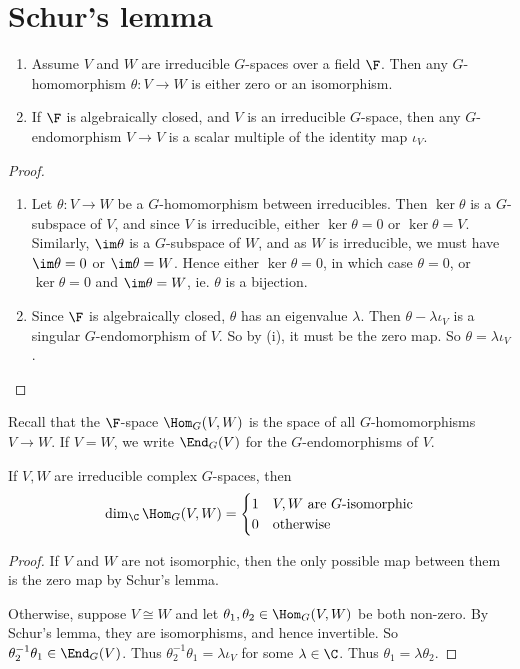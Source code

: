 \documentclass[a4paper]{article}
\begin{document}
\section{Schur's lemma}
\begin{thm}\leavevmode
  \begin{enumerate}
    \item Assume $V$ and $W$ are irreducible $G$-spaces over a field $\F$. Then any $G$-homomorphism $\theta: V \to W$ is either zero or an isomorphism.
    \item If $\F$ is algebraically closed, and $V$ is an irreducible $G$-space, then any $G$-endomorphism $V \to V$ is a scalar multiple of the identity map $\iota_V$.
  \end{enumerate}
\end{thm}

\begin{proof}\leavevmode
  \begin{enumerate}
    \item Let $\theta: V \to W$ be a $G$-homomorphism between irreducibles. Then $\ker \theta$ is a $G$-subspace of $V$, and since $V$ is irreducible, either $\ker \theta = 0$ or $\ker \theta = V$. Similarly, $\im \theta$ is a $G$-subspace of $W$, and as $W$ is irreducible, we must have $\im \theta = 0$ or $\im \theta = W$. Hence either $\ker \theta = 0$, in which case $\theta = 0$, or $\ker \theta = 0$ and $\im \theta = W$, ie. $\theta$ is a bijection.
    \item Since $\F$ is algebraically closed, $\theta$ has an eigenvalue $\lambda$. Then $\theta - \lambda \iota_V$ is a singular $G$-endomorphism of $V$. So by (i), it must be the zero map. So $\theta = \lambda \iota_V$.
  \end{enumerate}
\end{proof}

Recall that the $\F$-space $\Hom_G(V, W)$ is the space of all $G$-homomorphisms $V \to W$. If $V = W$, we write $\End_G(V)$ for the $G$-endomorphisms of $V$.

\begin{cor}
  If $V, W$ are irreducible complex $G$-spaces, then
  \[
    \dim_\C \Hom_G(V, W) =
    \begin{cases}
      1 & V, W\text{ are $G$-isomorphic}\\
      0 & \text{otherwise}
    \end{cases}
  \]
\end{cor}

\begin{proof}
  If $V$ and $W$ are not isomorphic, then the only possible map between them is the zero map by Schur's lemma.

  Otherwise, suppose $V \cong W$ and let $\theta_1, \theta_2 \in \Hom_G(V, W)$ be both non-zero. By Schur's lemma, they are isomorphisms, and hence invertible. So $\theta_2^{-1}\theta_1 \in \End_G(V)$. Thus $\theta_2^{-1}\theta_1 = \lambda \iota_V$ for some $\lambda \in \C$. Thus $\theta_1 = \lambda \theta_2$.
\end{proof}
\end{document}
